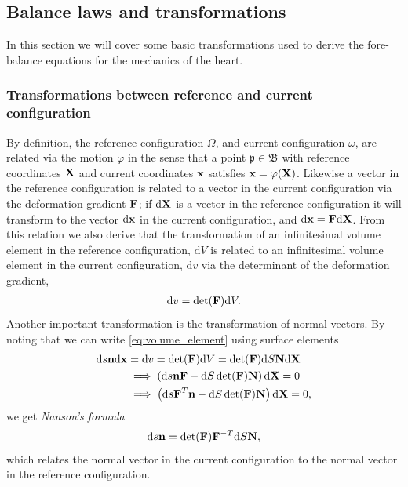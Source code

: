 \subsection{Balance laws and transformations}
In this section we will cover some basic transformations used to
derive the fore-balance equations for the mechanics of the heart. 

\subsubsection{Transformations between reference and current
  configuration}
By definition, the reference configuration $\Omega$, and current
configuration $\omega$, are related via the motion $\varphi$ in the
sense that a point $\mathfrak{p} \in \mathfrak{B}$ with reference
coordinates $\mathbf{X}$ and current coordinates $\mathbf{x}$ satisfies $\mathbf{x} =
\varphi(\mathbf{X})$. Likewise a vector in the reference configuration is
related to a vector in the current configuration  via the
deformation gradient $\mathbf{F}$; if $\mathrm{d}\mathbf{X}$ is a vector in the
reference configuration it will transform to the vector
$\mathrm{d}\mathbf{x}$ in the current configuration, and $\mathrm{d}\mathbf{x} =
\mathbf{F} \mathrm{d}\mathbf{X}$. From this relation we also derive that the
transformation of an infinitesimal volume element in the reference
configuration, $\mathrm{d}V$ is related to an infinitesimal volume
element in the current configuration, $\mathrm{d}v$  via the determinant of the
deformation gradient,
\begin{align}
  \mathrm{d}v =\det(\mathbf{F}) \mathrm{d}V.
  \label{eq:volume_element}
\end{align}
Another important transformation is the transformation of normal
vectors. By noting that we can write \eqref{eq:volume_element} using
surface elements
\begin{align*}
  \mathrm{d}s \mathbf{n} \mathrm{d}\mathbf{x}  &= \mathrm{d}v = \det(\mathbf{F}) \mathrm{d}V = \det(\mathbf{F}) \mathrm{d}S  \mathbf{N} \mathrm{d}\mathbf{X}\\
  &\implies \left( \mathrm{d}s \mathbf{n} \mathbf{F}  - \mathrm{d}S \det(\mathbf{F}) \mathbf{N} \right) \mathrm{d}\mathbf{X} = 0\\
  &\implies \left( \mathrm{d}s \mathbf{F}^T \mathbf{n}  - \mathrm{d}S \det(\mathbf{F}) \mathbf{N} \right) \mathrm{d}\mathbf{X} = 0,\\
\end{align*}
we get \emph{Nanson's formula}
\begin{align}
  \mathrm{d}s \mathbf{n}  =  \det(\mathbf{F}) \mathbf{F}^{-T} \mathrm{d}S \mathbf{N},
\end{align}
which relates the normal vector in the current configuration to the
normal vector in the reference configuration.


